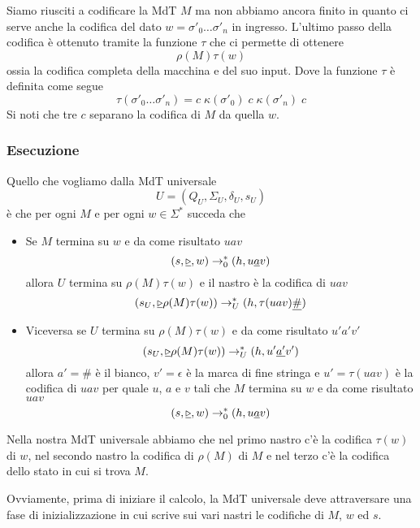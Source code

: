Siamo riusciti a codificare la MdT $M$ ma non abbiamo ancora
finito in quanto ci serve anche la codifica del dato
$w = \sigma'_0 \dots \sigma'_n$ in ingresso. L'ultimo passo
della codifica è ottenuto tramite la funzione $\tau$ che ci
permette di ottenere
\[ \rho(M) \tau(w) \]
ossia la codifica completa della macchina e del suo input. Dove
la funzione $\tau$ è definita come segue
\[
	\tau(\sigma'_0 \dots \sigma'_n) =
	c \; \kappa(\sigma'_0) \;
	c \; \kappa(\sigma'_n) \; c
\]
Si noti che tre $c$ separano la codifica di $M$ da quella $w$.

\subsubsection{Esecuzione}
Quello che vogliamo dalla MdT universale
\[ U = (Q_U, \Sigma_U, \delta_U, s_U) \]
è che per ogni $M$ e per ogni $w \in \Sigma^*$ succeda che
\begin{itemize}
	\item Se $M$ termina su $w$ e da come risultato $uav$
	      \[
		      (s, \underline{\triangleright}, w) \rightarrow^*_0
		      (h, u \underline{a} v)
	      \]
	      allora $U$ termina su $\rho(M) \tau(w)$ e il nastro è
	      la codifica di $uav$
	      \[
		      (s_U, \underline{\triangleright} \rho(M) \tau(w))
		      \rightarrow^*_U (h, \tau(uav) \underline{\#})
	      \]
	\item Viceversa se $U$ termina su $\rho(M) \tau(w)$ e da come
	      risultato $u'a'v'$
	      \[
		      (s_U, \underline{\triangleright} \rho(M) \tau(w))
		      \rightarrow^*_U (h, u' \underline{a'}v')
	      \]
	      allora $a' = \#$ è il bianco, $v' = \epsilon$ è la
	      marca di fine stringa e $u' = \tau(uav)$ è la codifica
	      di $uav$ per quale $u$, $a$ e $v$ tali che $M$ termina
	      su $w$ e da come risultato $uav$
	      \[
		      (s, \underline{\triangleright}, w) \rightarrow^*_0
		      (h, u \underline{a} v)
	      \]
\end{itemize}
Nella nostra MdT universale abbiamo che nel primo nastro c'è la
codifica $\tau(w)$ di $w$, nel secondo nastro la codifica di
$\rho(M)$ di $M$ e nel terzo c'è la codifica dello stato in cui
si trova $M$.

Ovviamente, prima di iniziare il calcolo, la MdT universale deve
attraversare una fase di inizializzazione in cui scrive sui vari
nastri le codifiche di $M$, $w$ ed $s$.

